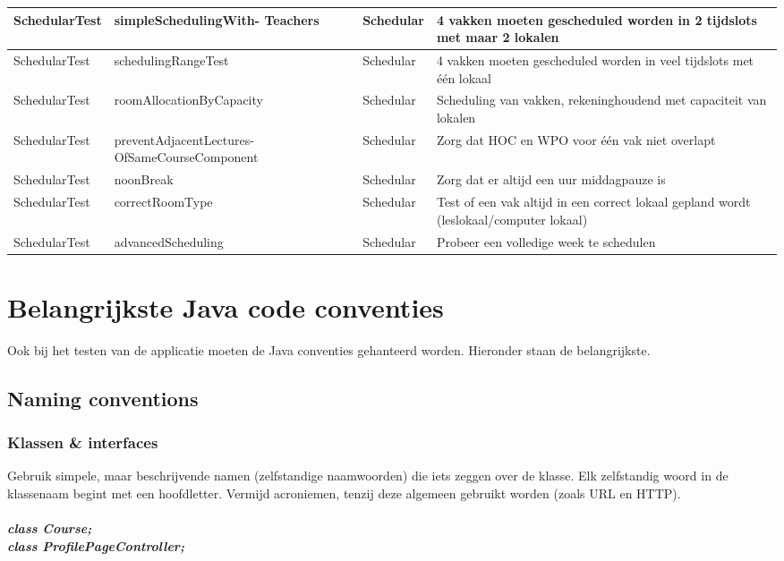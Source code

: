 \begin{table}[htbp]
\begin{tabularx}{\textwidth}{|X|X|X|X|}
		SchedularTest & simpleSchedulingWith- Teachers & Schedular & 4 vakken moeten gescheduled worden in 2 tijdslots met maar 2 lokalen \\ \hline
		SchedularTest & schedulingRangeTest & Schedular & 4 vakken moeten gescheduled worden in veel tijdslots met één lokaal \\ \hline
		SchedularTest & roomAllocationByCapacity & Schedular & Scheduling van vakken, rekeninghoudend met capaciteit van lokalen \\ \hline
		SchedularTest & preventAdjacentLectures- OfSameCourseComponent & Schedular & Zorg dat HOC en WPO voor één vak niet overlapt \\ \hline
		SchedularTest & noonBreak & Schedular & Zorg dat er altijd een uur middagpauze is \\ \hline
		SchedularTest & correctRoomType & Schedular & Test of een vak altijd in een correct lokaal gepland wordt (leslokaal/computer lokaal) \\ \hline
		SchedularTest & advancedScheduling & Schedular & Probeer een volledige week te schedulen \\ \hline
		
	\end{tabularx}
\end{table}

\newpage
\section{Belangrijkste Java code conventies}
Ook bij het testen van de applicatie moeten de Java conventies gehanteerd worden. 
Hieronder staan de belangrijkste.
\subsection{Naming conventions}
	\subsubsection{Klassen \& interfaces}
		Gebruik simpele, maar beschrijvende namen (zelfstandige naamwoorden) die iets zeggen over de klasse. Elk zelfstandig woord in de klassenaam begint met een hoofdletter. Vermijd acroniemen, tenzij deze algemeen gebruikt worden (zoals URL en HTTP).
		\\ \\
		\emph{\textbf{class Course;}} \\
		\emph{\textbf{class ProfilePageController;}}
		
